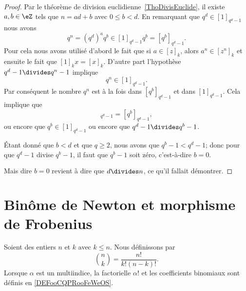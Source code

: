 \begin{proof}
	Par le théorème de division euclidienne~\ref{ThoDivisEuclide}, il existe \( a,b\in \eZ\) tels que \( n=ad+b\) avec \( 0\leq b<d\). En remarquant que \( q^d\in[1]_{q^d-1}\) nous avons
	\begin{equation}
		q^n=(q^d)^aq^b\in[1]_{q^d-1}q^b=[q^b]_{q^d-1}.
	\end{equation}
	Pour cela nous avons utilisé d'abord le fait que si \( a\in [z]_k\), alors \( a^n\in[z^n]_k\) et ensuite le fait que \( [1]_kx=[x]_k\). D'autre part l'hypothèse \( q^d-1\divides q^n-1\) implique
	\begin{equation}
		q^n\in[1]_{q^d-1}.
	\end{equation}
	Par conséquent le nombre \( q^n\) est à la fois dans \( [q^b]_{q^d-1}\) et dans \( [1]_{q^d-1}\). Cela implique que
	\begin{equation}
		[1]_{q^d-1}=[q^b]_{q^d-1},
	\end{equation}
	ou encore que \( q^b\in[1]_{q^d-1}\) ou encore que \( q^d-1\divides q^b-1\).

	Étant donné que \( b<d\) et que \( q\geq 2\), nous avons que \( q^b-1<q^d-1\); donc pour que \( q^d-1\) divise \( q^b-1\), il faut que \( q^b-1\) soit zéro, c'est-à-dire \( b=0\).

	Mais dire \( b=0\) revient à dire que \( d\divides n\), ce qu'il fallait démontrer.
\end{proof}

\section{Binôme de Newton et morphisme de Frobenius}

\begin{definition}		\label{DEFooHXNFooOBKgqD}
	Soient des entiers \( n\) et \( k\) avec \( k\leq n\). Nous définissons  par
	\begin{equation}		\label{EQooJJYGooTvmSAt}
		{n\choose k} = \frac{ n! }{ k!(n-k)! }.
	\end{equation}
	Lorsque \( \alpha\) est un multiindice, la factorielle \( \alpha!\) et les coefficients binomiaux sont définis en \ref{DEFooCQPRooFeWeOS}.
\end{definition}

